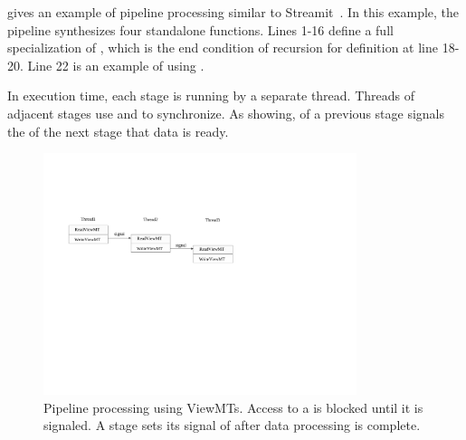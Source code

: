  gives an example of pipeline processing similar to Streamit~\cite{ThiesKA02}.
In this example, the pipeline synthesizes four standalone functions.
Lines 1-16 define a full specialization of , which is the end
condition of recursion for definition  at line 18-20.
Line 22 is an example of using . 

In execution time, each stage is running by a separate thread. Threads of
adjacent stages use  and  to synchronize.
As  showing,  of a previous stage signals the
 of the next stage that data is ready.



\begin{figure}[tp]
  \includegraphics[width=3.6in]{../viewmt}
  \caption{Pipeline processing using ViewMTs. Access to a  is
  blocked until it is signaled. A stage sets its signal of 
after data processing is complete.}
  \label{fig:viewmt}
\end{figure}

